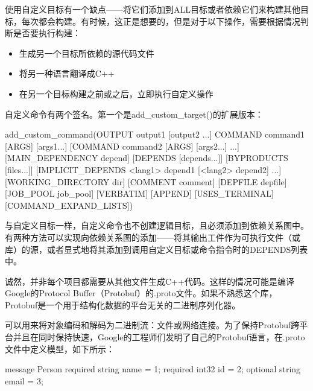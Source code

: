
使用自定义目标有一个缺点——将它们添加到ALL目标或者依赖它们来构建其他目标，每次都会构建。有时候，这正是想要的，但是对于以下操作，需要根据情况判断是否要执行构建：

\begin{itemize}
\item
生成另一个目标所依赖的源代码文件

\item
将另一种语言翻译成C++

\item
在另一个目标构建之前或之后，立即执行自定义操作
\end{itemize}

自定义命令有两个签名。第一个是add\_custom\_target()的扩展版本：

\begin{shell}
add_custom_command(OUTPUT output1 [output2 ...]
                   COMMAND command1 [ARGS] [args1...]
                   [COMMAND command2 [ARGS] [args2...] ...]
                   [MAIN_DEPENDENCY depend]
                   [DEPENDS [depends...]]
                   [BYPRODUCTS [files...]]
                   [IMPLICIT_DEPENDS <lang1> depend1
                                    [<lang2> depend2] ...]
                   [WORKING_DIRECTORY dir]
                   [COMMENT comment]
                   [DEPFILE depfile]
                   [JOB_POOL job_pool]
                   [VERBATIM] [APPEND] [USES_TERMINAL]
                   [COMMAND_EXPAND_LISTS])
\end{shell}

与自定义目标一样，自定义命令也不创建逻辑目标，且必须添加到依赖关系图中。有两种方法可以实现向依赖关系图的添加——将其输出工件作为可执行文件（或库）的源，或者显式地将其添加到调用自定义目标或命令指令时的DEPENDS列表中。


诚然，并非每个项目都需要从其他文件生成C++代码。这样的情况可能是编译Google的Protocol Buffer（Protobuf）的.proto文件。如果不熟悉这个库，Protobuf是一个用于结构化数据的平台无关的二进制序列化器。

可以用来将对象编码和解码为二进制流：文件或网络连接。为了保持Protobuf跨平台并且在同时保持快速，Google的工程师们发明了自己的Protobuf语言，在.proto文件中定义模型，如下所示：

\begin{shell}
message Person {
    required string name = 1;
    required int32 id = 2;
    optional string email = 3;
}
\end{shell}

